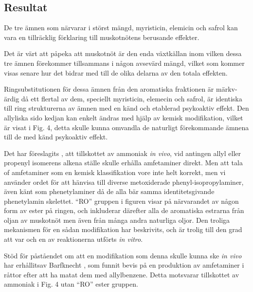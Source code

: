 \documentclass{theme/franska}
\begin{document}
{%

	\subsection{Resultat}

	De tre ämnen som närvarar i störst mängd, myristicin, elemicin och safrol kan vara en tillräcklig förklaring till muskotnötens berusande effekter.

	Det är värt att påpeka att muskotnöt är den enda växtkällan inom vilken dessa tre ämnen förekommer tillsammans i någon avsevärd mängd, vilket som kommer visas senare hur det bidrar med till de olika delarna av den totala effekten.

	Ringsubstitutionen för dessa ämnen från den aromatiska fraktionen är märkv-ärdig då ett flertal av dem, speciellt myristicin, elemecin och safrol, är identiska till ring strukturerna av ämnen med en känd och etablerad psykoaktiv effekt. Den allyliska sido kedjan kan enkelt ändras med hjälp av kemisk modifikation, vilket är visat i Fig. 4, detta skulle kunna omvandla de naturligt förekommande ämnena till de med känd psykoaktiv effekt.

	Det har föreslagits \cite{shulgin1967chemistry}, att tillskottet av ammoniak \textit{in vivo}, vid antingen allyl eller propenyl isomerens alkena ställe skulle erhålla amfetaminer direkt.
	Men att tala of amfetaminer som en kemisk klassifikation vore inte helt korrekt, men vi använder ordet för att hänvisa till diverse metoxiderade phenyl-isopropylaminer, även känt som phenetylaminer då de alla bär samma identitetsgivande phenetylamin skelettet.
	``RO'' gruppen i figuren visar på närvarandet av någon form av ester på ringen,	och inkluderar därefter alla de aromatiska estrarna från oljan av muskotnöt men även
	från många andra naturliga oljor.
	Den troliga mekanismen för en sådan  modifikation har beskrivits,
	och är trolig till den grad att var och en av reaktionerna utförts \textit{in vitro}.

	Stöd för påståendet om att en modifikation som denna skulle kunna ske \textit{in vivo} har erhållitsav Barfknecht \cite{shulgin1967chemistry}, som funnit bevis på en produktion av amfetaminer i råttor
	efter att ha matat dem med allylbenzene. Detta motsvarar tillskottet av
	ammoniak i Fig. 4 utan ``RO'' ester gruppen.




}
\end{document}
